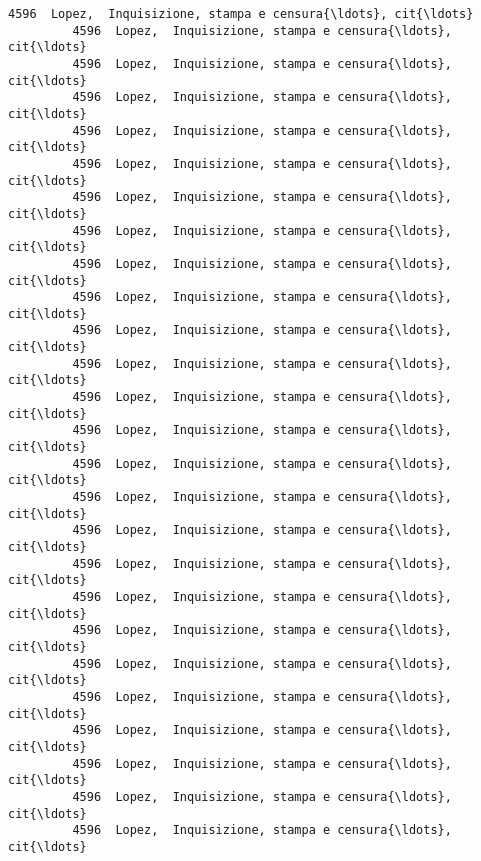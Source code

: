\documentclass[11pt]{article}
\begin{document}
\begin{Verbatim}[commandchars=\\\{\}]
         4596  Lopez,  Inquisizione, stampa e censura{\ldots}, cit{\ldots}   
         4596  Lopez,  Inquisizione, stampa e censura{\ldots}, cit{\ldots}   
         4596  Lopez,  Inquisizione, stampa e censura{\ldots}, cit{\ldots}   
         4596  Lopez,  Inquisizione, stampa e censura{\ldots}, cit{\ldots}   
         4596  Lopez,  Inquisizione, stampa e censura{\ldots}, cit{\ldots}   
         4596  Lopez,  Inquisizione, stampa e censura{\ldots}, cit{\ldots}   
         4596  Lopez,  Inquisizione, stampa e censura{\ldots}, cit{\ldots}   
         4596  Lopez,  Inquisizione, stampa e censura{\ldots}, cit{\ldots}   
         4596  Lopez,  Inquisizione, stampa e censura{\ldots}, cit{\ldots}   
         4596  Lopez,  Inquisizione, stampa e censura{\ldots}, cit{\ldots}   
         4596  Lopez,  Inquisizione, stampa e censura{\ldots}, cit{\ldots}   
         4596  Lopez,  Inquisizione, stampa e censura{\ldots}, cit{\ldots}   
         4596  Lopez,  Inquisizione, stampa e censura{\ldots}, cit{\ldots}   
         4596  Lopez,  Inquisizione, stampa e censura{\ldots}, cit{\ldots}   
         4596  Lopez,  Inquisizione, stampa e censura{\ldots}, cit{\ldots}   
         4596  Lopez,  Inquisizione, stampa e censura{\ldots}, cit{\ldots}   
         4596  Lopez,  Inquisizione, stampa e censura{\ldots}, cit{\ldots}   
         4596  Lopez,  Inquisizione, stampa e censura{\ldots}, cit{\ldots}   
         4596  Lopez,  Inquisizione, stampa e censura{\ldots}, cit{\ldots}   
         4596  Lopez,  Inquisizione, stampa e censura{\ldots}, cit{\ldots}   
         4596  Lopez,  Inquisizione, stampa e censura{\ldots}, cit{\ldots}   
         4596  Lopez,  Inquisizione, stampa e censura{\ldots}, cit{\ldots}   
         4596  Lopez,  Inquisizione, stampa e censura{\ldots}, cit{\ldots}   
         4596  Lopez,  Inquisizione, stampa e censura{\ldots}, cit{\ldots}   
         4596  Lopez,  Inquisizione, stampa e censura{\ldots}, cit{\ldots}   
         4596  Lopez,  Inquisizione, stampa e censura{\ldots}, cit{\ldots}   
         

\end{Verbatim}
\end{document}
